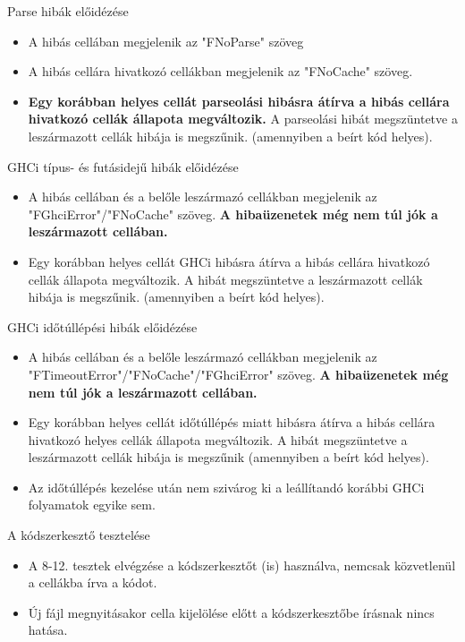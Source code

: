\begin{compactenum}
	\item Parse hibák előidézése
	\begin{itemize}
		\item A hibás cellában megjelenik az "FNoParse" szöveg
		\item A hibás cellára hivatkozó cellákban megjelenik az "FNoCache" szöveg.
		\item \textbf{Egy korábban helyes cellát parseolási hibásra átírva a hibás cellára hivatkozó cellák állapota megváltozik.} A parseolási hibát megszüntetve a leszármazott cellák hibája is megszűnik. (amennyiben a beírt kód helyes).
	\end{itemize}
	\item GHCi típus- és futásidejű hibák előidézése
	\begin{itemize}
		\item A hibás cellában és a belőle leszármazó cellákban megjelenik az "FGhciError"/"FNoCache" szöveg. \textbf{A hibaüzenetek még nem túl jók a leszármazott cellában.}
		\item Egy korábban helyes cellát GHCi hibásra átírva a hibás cellára hivatkozó cellák állapota megváltozik. A hibát megszüntetve a leszármazott cellák hibája is megszűnik. (amennyiben a beírt kód helyes).
	\end{itemize}
	\item GHCi időtúllépési hibák előidézése
	\begin{itemize}
		\item A hibás cellában és a belőle leszármazó cellákban megjelenik az "FTimeoutError"/"FNoCache"/"FGhciError" szöveg. \textbf{A hibaüzenetek még nem túl jók a leszármazott cellában.}
		\item Egy korábban helyes cellát időtúllépés miatt hibásra átírva a hibás cellára hivatkozó helyes cellák állapota megváltozik. A hibát megszüntetve a leszármazott cellák hibája is megszűnik (amennyiben a beírt kód helyes).
		\item Az időtúllépés kezelése után nem szivárog ki a leállítandó korábbi GHCi folyamatok egyike sem.
	\end{itemize}
	\item A kódszerkesztő tesztelése 
	\begin{itemize}
		\item A 8-12. tesztek elvégzése a kódszerkesztőt (is) használva, nemcsak közvetlenül a cellákba írva a kódot.
		\item Új fájl megnyitásakor cella kijelölése előtt a kódszerkesztőbe írásnak nincs hatása.	
	\end{itemize}		
\end{compactenum}


